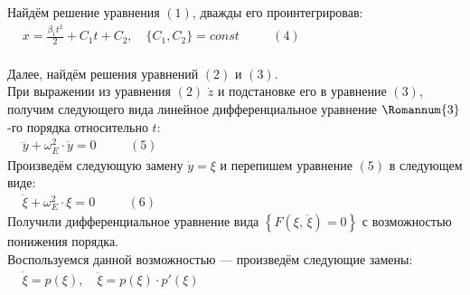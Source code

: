 \documentclass[oneside,final,14pt]{extarticle}
\begin{document}
		\noindent Найдём решение уравнения $(1)$, дважды его проинтегрировав: \\
		
		\begin{math}
			\begin{aligned}
				& x = \frac{\beta_{1}t^{2}}{2} + C_{1}t + C_{2}, \quad \{C_{1}, C_{2}\} = const \quad && (4)
			\end{aligned}
		\end{math} \\\\
		
		\noindent Далее, найдём решения уравнений $(2)$ и $(3)$. \\
		
		\noindent При выражении из уравнения $(2)$ $\dot{z}$ и подстановке его в уравнение $(3)$, получим следующего вида линейное дифференциальное уравнение $\Romannum{3}$-го порядка относительно $t$: \\
		
		\begin{math}
			\begin{aligned}
				& \dddot{y} + \omega_{E}^{2} \cdot \dot{y} = 0 \quad && (5)
			\end{aligned}
		\end{math} \\
		
		\noindent Произведём следующую замену $\dot{y} = \xi$ и перепишем уравнение $(5)$ в следующем виде: \\
		
		\begin{math}
			\begin{aligned}
				& \ddot{\xi} + \omega_{E}^{2} \cdot \xi = 0 \quad && (6)
			\end{aligned}
		\end{math} \\
		
		\noindent Получили дифференциальное уравнение вида $\left\{F(\xi,\, \ddot{\xi}) = 0\right\}$ с возможностью понижения порядка. \\
		
		\noindent Воспользуемся данной возможностью --- произведём следующие замены: \\
		
		\begin{math}
			\begin{aligned}
				& \dot{\xi} = p(\xi), \quad \ddot{\xi} = p(\xi) \cdot p'(\xi)
			\end{aligned}
		\end{math} \\
		
\end{document}
